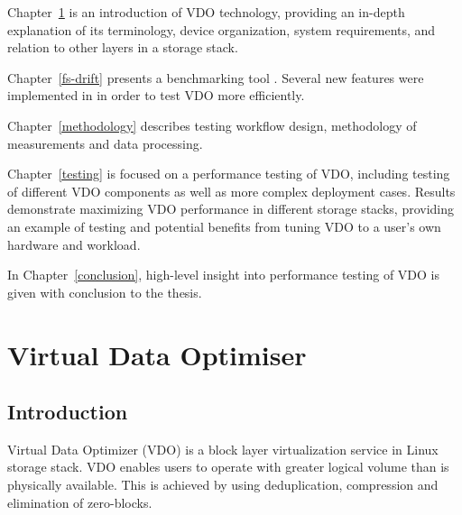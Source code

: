 \documentclass[
  color, %
  table, %
  lof,   %
  lot,   %
]{fithesis3}
\begin{document}
Chapter~\ref{VDO} is an introduction of VDO technology, providing an in-depth explanation of its terminology, device organization, system requirements, and relation to other layers in a storage stack.

Chapter~\ref{fs-drift} presents a benchmarking tool \fsdrift. Several new features were implemented in \fsdrift  in order to test VDO more efficiently.

Chapter~\ref{methodology} describes testing workflow design, methodology of measurements and data processing.

Chapter~\ref{testing} is focused on a performance testing of VDO, including testing of different VDO components as well as more complex deployment cases. Results demonstrate maximizing VDO performance in different storage stacks, providing an example of testing and potential benefits from tuning VDO to a user's own hardware and workload.

In Chapter~\ref{conclusion}, high-level insight into performance testing of VDO is given with conclusion to the thesis.

\chapter{Virtual Data Optimiser}
\label{VDO}
\section{Introduction}
Virtual Data Optimizer (VDO) is a block layer virtualization service in Linux storage stack. VDO enables users to operate with greater logical volume than is physically available. This is achieved by using deduplication, compression and elimination of zero-blocks.
\end{document}
